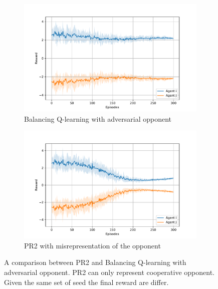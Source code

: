 \begin{figure}[h]
\centering
\begin{subfigure}{.5\textwidth}
  \centering
  \includegraphics[width=\linewidth]{figures/Balancing_correct.pdf}
  \caption{Balancing Q-learning with adversarial opponent}
  \label{fig:chap3-balancing-q-min-max-matrix}
\end{subfigure}%
\begin{subfigure}{.5\textwidth}
  \centering
  \includegraphics[width=\linewidth]{figures/Balancing_wrong.pdf}
  \caption{PR2 with misrepresentation of the opponent}
  \label{fig:chap3-pr2-min-max-matrix}
\end{subfigure}
\caption{A comparison between PR2 and Balancing Q-learning with adversarial opponent. PR2 can only represent cooperative opponent. Given the same set of seed the final reward are differ.}
\label{fig:chap3-comparison-balance-pr2-matrix}
\end{figure}


